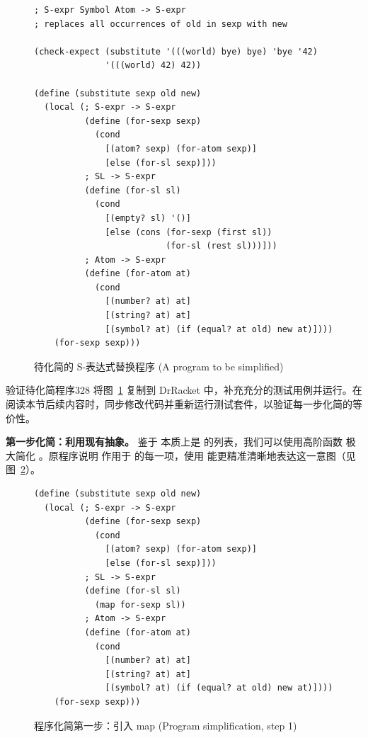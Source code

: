 \begin{figure}[htbp]
  \centering
\begin{lstlisting}[language=BSL, basicstyle=\scriptsize\ttfamily]
; S-expr Symbol Atom -> S-expr
; replaces all occurrences of old in sexp with new

(check-expect (substitute '(((world) bye) bye) 'bye '42)
              '(((world) 42) 42))

(define (substitute sexp old new)
  (local (; S-expr -> S-expr
          (define (for-sexp sexp)
            (cond
              [(atom? sexp) (for-atom sexp)]
              [else (for-sl sexp)]))
          ; SL -> S-expr
          (define (for-sl sl)
            (cond
              [(empty? sl) '()]
              [else (cons (for-sexp (first sl))
                          (for-sl (rest sl)))]))
          ; Atom -> S-expr
          (define (for-atom at)
            (cond
              [(number? at) at]
              [(string? at) at]
              [(symbol? at) (if (equal? at old) new at)])))
    (for-sexp sexp)))
\end{lstlisting}
  \caption{待化简的 S-表达式替换程序 (A program to be simplified)}
  \label{fig:120}
\end{figure}

\begin{exercise}{验证待化简程序}{328}
将图~\ref{fig:120} 复制到 DrRacket 中，补充充分的测试用例并运行。在阅读本节后续内容时，同步修改代码并重新运行测试套件，以验证每一步化简的等价性。
\end{exercise}

\textbf{第一步化简：利用现有抽象。} 鉴于  本质上是  的列表，我们可以使用高阶函数  极大简化 。原程序说明  作用于  的每一项，使用  能更精准清晰地表达这一意图（见图~\ref{fig:121}）。

\begin{figure}[htbp]
  \centering
\begin{lstlisting}[language=BSL, basicstyle=\scriptsize\ttfamily]
(define (substitute sexp old new)
  (local (; S-expr -> S-expr
          (define (for-sexp sexp)
            (cond
              [(atom? sexp) (for-atom sexp)]
              [else (for-sl sexp)]))
          ; SL -> S-expr
          (define (for-sl sl)
            (map for-sexp sl))
          ; Atom -> S-expr
          (define (for-atom at)
            (cond
              [(number? at) at]
              [(string? at) at]
              [(symbol? at) (if (equal? at old) new at)])))
    (for-sexp sexp)))
\end{lstlisting}
  \caption{程序化简第一步：引入 map (Program simplification, step 1)}
  \label{fig:121}
\end{figure}

